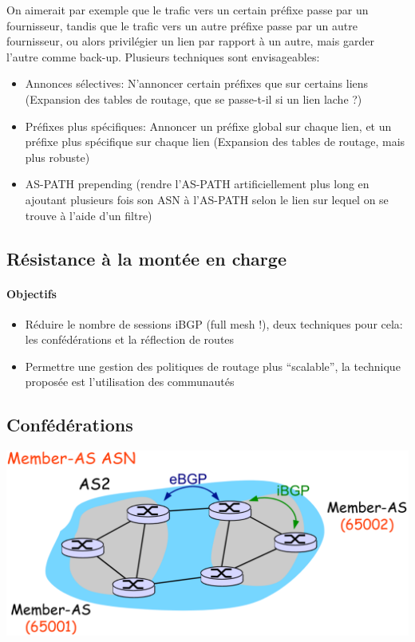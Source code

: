 \documentclass{article}
\begin{document}
\begin{sffamily}
On aimerait par exemple que le trafic vers un certain préfixe passe
par un fournisseur, tandis que le trafic vers un autre préfixe passe
par un autre fournisseur, ou alors privilégier un lien par rapport à
un autre, mais garder l'autre comme back-up. Plusieurs techniques sont
envisageables:

\begin{itemize}
\item Annonces sélectives: N'annoncer certain préfixes que sur
  certains liens (Expansion des tables de routage, que se passe-t-il
  si un lien lache ?)
\item Préfixes plus spécifiques: Annoncer un préfixe global sur chaque
  lien, et un préfixe plus spécifique sur chaque lien (Expansion des
  tables de routage, mais plus robuste)
\item AS-PATH prepending (rendre l'AS-PATH artificiellement plus long
  en ajoutant plusieurs fois son ASN à l'AS-PATH selon le lien sur
  lequel on se trouve à l'aide d'un filtre)
\end{itemize}

\subsection{Résistance à la montée en charge}

\paragraph{Objectifs}

\begin{itemize}
\item Réduire le nombre de sessions iBGP (full mesh !), deux
  techniques pour cela: les confédérations et la réflection de routes
\item Permettre une gestion des politiques de routage plus
  ``scalable'', la technique proposée est l'utilisation des
  communautés
\end{itemize}

\subsection{Confédérations}

\includegraphics[width=\textwidth]{fab_006.pdf}


\end{sffamily}
\end{document}
